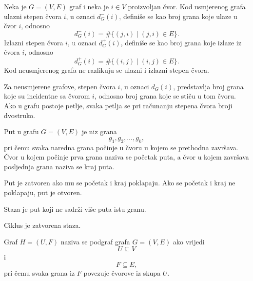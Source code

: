 \begin{definition}
Neka je \(G=(V,E)\) graf i neka je \(i \in V\) proizvoljan čvor. 
Kod usmjerenog grafa ulazni stepen čvora \(i\), u oznaci \(d_G^-(i)\), definiše se kao broj grana koje ulaze u čvor \(i\), odnosno
\begin{equation}
    d_G^-(i) = \#\{(j,i) \mid (j,i) \in E\}.
\end{equation}
Izlazni stepen čvora \(i\), u oznaci \(d_G^+(i)\), definiše se kao broj grana koje izlaze iz čvora \(i\), odnosno
\begin{equation}
    d_G^+(i) = \#\{(i,j) \mid (i,j) \in E\}.
\end{equation}
Kod neusmjerenog grafa ne razlikuju se ulazni i izlazni stepen čvora. \cite{juric2019elementi}
\end{definition}
\begin{definition}
    
Za neusmjerene grafove, stepen čvora \(i\), u oznaci \(d_G(i)\), predstavlja broj grana koje su incidentne sa čvorom \(i\), odnosno broj grana koje se stiču u tom čvoru.
Ako u grafu postoje petlje, svaka petlja se pri računanju stepena čvora broji dvostruko. \cite{juric2019elementi}
\end{definition}

\begin{definition}
Put u grafu \(G=(V,E)\) je niz grana
\begin{equation}
    g_1,g_2,\ldots,g_k,
\end{equation}
pri čemu svaka naredna grana počinje u čvoru u kojem se prethodna završava. Čvor u kojem počinje prva grana naziva se početak puta, a čvor u kojem završava posljednja grana naziva se kraj puta. \cite{juric2019elementi}
\end{definition}
\begin{definition}
Put je zatvoren ako mu se početak i kraj poklapaju. Ako se početak i kraj ne poklapaju, put je otvoren. \cite{juric2019elementi}
\end{definition}
\begin{definition}
Staza je put koji ne sadrži više puta istu granu. \cite{juric2019elementi}
\end{definition}
\begin{definition}
Ciklus je zatvorena staza. \cite{juric2019elementi}
\end{definition}

\begin{definition}
Graf \(H=(U,F)\) naziva se podgraf grafa \(G=(V,E)\) ako vrijedi
\begin{equation}
    U \subseteq V
\end{equation}
i
\begin{equation}
    F \subseteq E,
\end{equation}
pri čemu svaka grana iz \(F\) povezuje čvorove iz skupa \(U\). \cite{juric2019elementi}
\end{definition}

